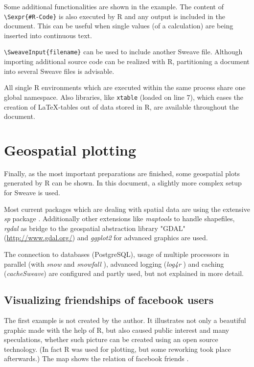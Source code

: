 \documentclass{ifacconf}
\begin{document}
Some additional functionalities are shown in the example. The content of
\texttt{\textbackslash{}Sexpr\{\#R-Code\}}
is also executed by R and any output is included in the document. This can be
useful when single values (of a calculation) are being inserted into continuous text.

\texttt{\textbackslash{}SweaveInput\{filename\}} can be used to include 
another Sweave file. Although importing additional source code can be realized with
R, partitioning a document into several Sweave files is advisable.

All single R environments which are executed within the same process share one
global namespace. Also libraries, like \texttt{xtable} (loaded on line 7), which eases the
creation of \LaTeX-tables out of data stored in R, are
available throughout the document.




\section{Geospatial plotting}

Finally, as the most important preparations are finished, some geospatial plots 
generated by R can be shown. In this document, a slightly more complex
setup for Sweave is used. 

Most current packages which are dealing with spatial data are using the
extensive \textit{sp} package \citep{RSpatialDataAnalysis}. Additionally
other extensions like \textit{maptools} to handle shapefiles, \textit{rgdal}
as bridge to the geospatial abstraction library "GDAL" (\url{http://www.gdal.org/})
and \textit{ggplot2} \citep{Rggplot2} for advanced graphics are used.

The connection to databases (PostgreSQL), usage of multiple processors 
in parallel (with \textit{snow} and \textit{snowfall} \citep{Rsnow, Rsnowfall}), 
advanced logging (\textit{log4r} \citep{Rlog4r}) and caching (\textit{cacheSweave}) 
are configured and partly used, but not explained in more detail.

\subsection{Visualizing friendships of facebook users}
The first example is not created by the author. It illustrates not only a
beautiful graphic made with the help of R, but also caused
public interest and many speculations, whether such picture can be
created using an open source technology. (In fact R was used for plotting,
but some reworking took place afterwards.) The map shows the relation of 
facebook friends \citep{FacebookFriendMap}.
\end{document}
